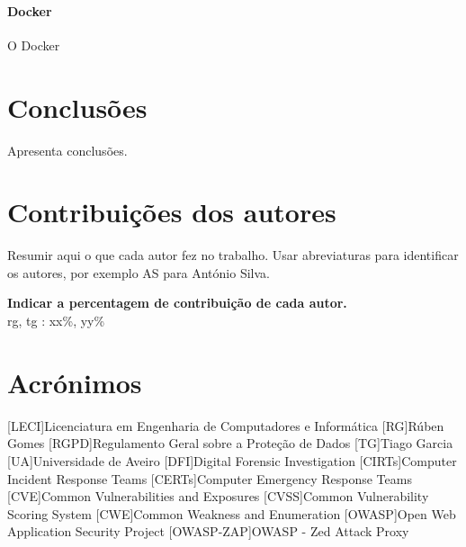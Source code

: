 \documentclass{report}
\begin{document}
\subsubsection{Docker}
\label{subsubsec:docker}
O Docker



\chapter{Conclusões}
\label{ch:conclusao}
Apresenta conclusões.

\chapter*{Contribuições dos autores}
Resumir aqui o que cada autor fez no trabalho.
Usar abreviaturas para identificar os autores,
por exemplo AS para António Silva.

\vspace{10pt}
\textbf{Indicar a percentagem de contribuição de cada autor.}\\

\ac{rg}, \ac{tg} : xx\%, yy\%\\


\chapter*{Acrónimos}
\begin{acronym}
    [LECI]{Licenciatura em Engenharia de Computadores e Informática}
    [RG]{Rúben Gomes}
    [RGPD]{Regulamento Geral sobre a Proteção de Dados}
    [TG]{Tiago Garcia}
    [UA]{Universidade de Aveiro}
    [DFI]{Digital Forensic Investigation}
    [CIRTs]{Computer Incident Response Teams}
    [CERTs]{Computer Emergency Response Teams}
    [CVE]{Common Vulnerabilities and Exposures}
    [CVSS]{Common Vulnerability Scoring System}
    [CWE]{Common Weakness and Enumeration}
    [OWASP]{Open Web Application Security Project}
    [OWASP-ZAP]{OWASP - Zed Attack Proxy}
\end{acronym}


\printbibliography
\end{document}
